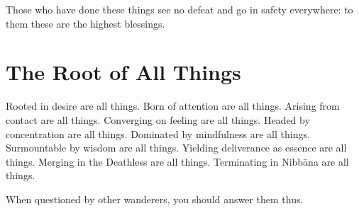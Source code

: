 Those who have done these things see no defeat and go in safety everywhere: to
them these are the highest blessings.


\ifhandbookedition
\vspace*{-\baselineskip}
\fi

\section*{The Root of All Things}

Rooted in desire are all things.
Born of attention are all things.
Arising from contact are all things.
Converging on feeling are all things.
Headed by concentration are all things.
Dominated by mindfulness are all things.
Surmountable by wisdom are all things.
Yielding deliverance as essence are all things.
Merging in the Deathless are all things.
Terminating in Nibbāna are all things.

When questioned by other wanderers, you should answer them thus.


